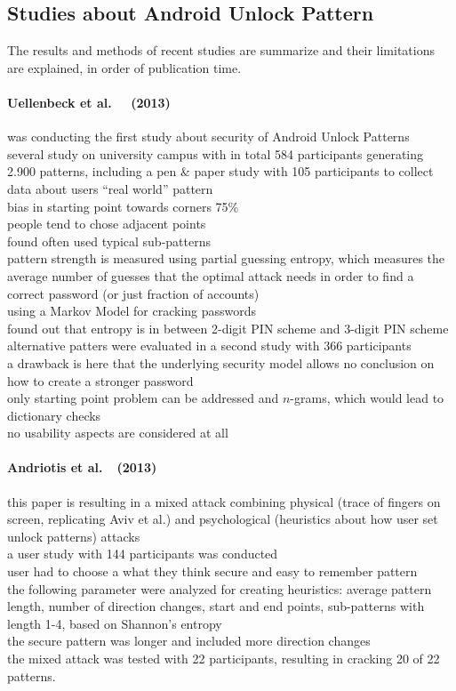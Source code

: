 \documentclass[twocolumn, a4paper, 10pt]{article}
\begin{document}
\subsection{Studies about Android Unlock Pattern}
\label{sec:relatedstudies}
The results and methods of recent studies are summarize and their limitations are explained, in order of publication time.
\paragraph{Uellenbeck et al. ~\cite{Uellenbeck:2013:QSG:2508859.2516700}~(2013)} was conducting the first study about security of Android Unlock Patterns\\
several study on university campus with in total 584 participants generating 2.900 patterns, including a pen \& paper study with 105 participants to collect data about users ``real world'' pattern\\
bias in starting point towards corners 75\%\\
people tend to chose adjacent points\\
found often used typical sub-patterns\\
pattern strength is measured using partial guessing entropy\cite{bonneau2012science}, which measures the average number of guesses that the optimal attack needs in order to find a correct password (or just fraction of accounts)\\
using a Markov Model for cracking passwords\\
found out that entropy is in between 2-digit PIN scheme and 3-digit PIN scheme\\
alternative patters were evaluated in a second study with 366 participants\\
a drawback is here that the underlying security model allows no conclusion on how to create a stronger password\\
only starting point problem can be addressed and $n$-grams, which would lead to dictionary checks\\
no usability aspects are considered at all

\paragraph{Andriotis et al.~\cite{Andriotis:2013:PSS:2462096.2462098}~(2013)} 
this paper is resulting in a mixed attack combining physical (trace of fingers on screen, replicating Aviv et al.\cite{Aviv:2010:SAS:1925004.1925009}) and psychological (heuristics about how user set unlock patterns) attacks \\
a user study with 144 participants was conducted\\
user had to choose a what they think secure and easy to remember pattern\\
the following parameter were analyzed for creating heuristics: average pattern length, number of direction changes, start and end points, sub-patterns with length 1-4, based on Shannon's entropy\\
the secure pattern was longer and included more direction changes\\
the mixed attack was tested with 22 participants, resulting in cracking 20 of 22 patterns.
\end{document}
